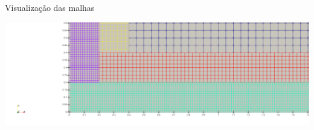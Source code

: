 \documentclass[../main/main.tex]{subfiles}
\begin{document}
\begin{frame}{Visualização das malhas}
\begin{center}
\begin{minipage}{0.75\textwidth}
            \includegraphics[height=0.3\textheight]{imgs/ref3_PorPartes_border.png}
        \end{minipage}
    \end{center}
\end{frame}
\end{document}
